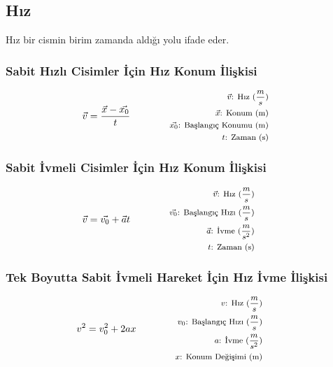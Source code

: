 \subsection{Hız}

Hız bir cismin birim zamanda aldığı yolu ifade eder.

\subsubsection*{Sabit Hızlı Cisimler İçin Hız Konum İlişkisi}
\begin{equation}
    \vec{v} = \frac{\vec{x} - \vec{x_0}}{t} \qquad \qquad \parbox{4cm}{\footnotesize$\begin{aligned}
        \vec{v}\text{: Hız } (\frac{m}{s}) \\
        \vec{x}\text{: Konum (m)} \\
        \vec{x_0}\text{: Başlangıç Konumu (m)} \\
        t\text{: Zaman (s)}
\end{aligned}$}
\end{equation}

\subsubsection*{Sabit İvmeli Cisimler İçin Hız Konum İlişkisi}
\begin{equation}
    \vec{v} = \vec{v_0} + \vec{a}t \qquad \qquad \parbox{4cm}{\footnotesize$\begin{aligned}
        \vec{v}\text{: Hız } (\frac{m}{s}) \\
        \vec{v_0}\text{: Başlangıç Hızı } (\frac{m}{s}) \\
        \vec{a}\text{: İvme } (\frac{m}{s^2}) \\
        t\text{: Zaman (s)}
\end{aligned}$}
\end{equation}

\subsubsection*{Tek Boyutta Sabit İvmeli Hareket İçin Hız İvme İlişkisi}
\begin{equation}
    v^2 = v_0 ^2 + 2ax \qquad \qquad \parbox{4cm}{\footnotesize$\begin{aligned}
        v\text{: Hız } (\frac{m}{s}) \\
        v_0\text{: Başlangıç Hızı } (\frac{m}{s}) \\
        a\text{: İvme } (\frac{m}{s^2}) \\
        x\text{: Konum Değişimi (m)}
\end{aligned}$}
\end{equation}

